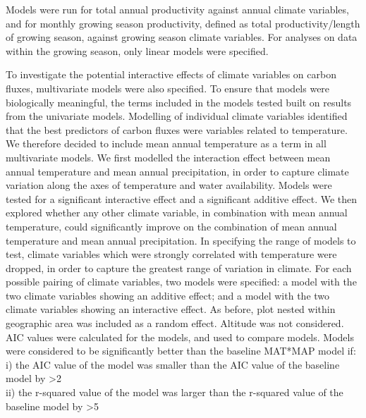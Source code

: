 \documentclass[]{article}
\begin{document}
Models were run for total annual productivity against annual climate
variables, and for monthly growing season productivity, defined as total
productivity/length of growing season, against growing season climate
variables. For analyses on data within the growing season, only linear
models were specified.

To investigate the potential interactive effects of climate variables on
carbon fluxes, multivariate models were also specified. To ensure that
models were biologically meaningful, the terms included in the models
tested built on results from the univariate models. Modelling of
individual climate variables identified that the best predictors of
carbon fluxes were variables related to temperature. We therefore
decided to include mean annual temperature as a term in all multivariate
models. We first modelled the interaction effect between mean annual
temperature and mean annual precipitation, in order to capture climate
variation along the axes of temperature and water availability. Models
were tested for a significant interactive effect and a significant
additive effect. We then explored whether any other climate variable, in
combination with mean annual temperature, could significantly improve on
the combination of mean annual temperature and mean annual
precipitation. In specifying the range of models to test, climate
variables which were strongly correlated with temperature were dropped,
in order to capture the greatest range of variation in climate. For each
possible pairing of climate variables, two models were specified: a
model with the two climate variables showing an additive effect; and a
model with the two climate variables showing an interactive effect. As
before, plot nested within geographic area was included as a random
effect. Altitude was not considered. AIC values were calculated for the
models, and used to compare models. Models were considered to be
significantly better than the baseline MAT*MAP model if:\\
i) the AIC value of the model was smaller than the AIC value of the
baseline model by \textgreater{}2\\
ii) the r-squared value of the model was larger than the r-squared value
of the baseline model by \textgreater{}5
\end{document}
